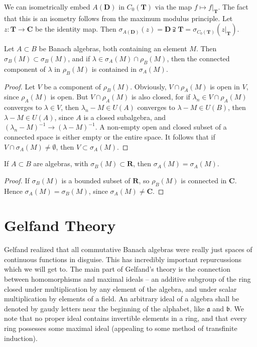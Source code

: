 \begin{example}
    We can isometrically embed $A(\mathbf{D})$ in $C_0(\mathbf{T})$ via the map $f \mapsto f|_\mathbf{T}$. The fact that this is an isometry follows from the maximum modulus principle. Let $z: \mathbf{T} \to \mathbf{C}$ be the identity map. Then $\sigma_{A(\mathbf{D})}(z) = \mathbf{D} \supsetneqq \mathbf{T} = \sigma_{C_0(\mathbf{T})}(z|_\mathbf{T})$.
\end{example}

\begin{theorem}
    Let $A \subset B$ be Banach algebras, both containing an element $M$. Then $\sigma_B(M) \subset \sigma_B(M)$, and if $\lambda \in \sigma_A(M) \cap \rho_B(M)$, then the connected component of $\lambda$ in $\rho_B(M)$ is contained in $\sigma_A(M)$.
\end{theorem}
\begin{proof}
    Let $V$ be a component of $\rho_B(M)$. Obviously, $V \cap \rho_A(M)$ is open in $V$, since $\rho_A(M)$ is open. But $V \cap \rho_A(M)$ is also closed, for if $\lambda_n \in V \cap \rho_A(M)$ converges to $\lambda \in V$, then $\lambda_n - M \in U(A)$ converges to $\lambda - M \in U(B)$, then $\lambda - M \in U(A)$, since $A$ is a closed subalgebra, and $(\lambda_n - M)^{-1} \to (\lambda - M)^{-1}$. A non-empty open and closed subset of a connected space is either empty or the entire space. It follows that if $V \cap \sigma_A(M) \neq \emptyset$, then $V \subset \sigma_A(M)$.
\end{proof}

\begin{corollary}
    If $A \subset B$ are algebras, with $\sigma_B(M) \subset \mathbf{R}$, then $\sigma_A(M) = \sigma_A(M)$.
\end{corollary}
\begin{proof}
    If $\sigma_B(M)$ is a bounded subset of $\mathbf{R}$, so $\rho_B(M)$ is connected in $\mathbf{C}$. Hence $\sigma_A(M) = \sigma_B(M)$, since $\sigma_A(M) \neq \mathbf{C}$.
\end{proof}

\section{Gelfand Theory}

Gelfand realized that all commutative Banach algebras were really just spaces of continuous functions in disguise. This has incredibly important repurcussions which we will get to. The main part of Gelfand's theory is the connection between homomorphisms and maximal ideals -- an additive subgroup of the ring closed under multiplication by any element of the algebra, and under scalar multiplication by elements of a field. An arbitrary ideal of a algebra shall be denoted by gaudy letters near the beginning of the alphabet, like $\mathfrak{a}$ and $\mathfrak{b}$. We note that no proper ideal contains invertible elements in a ring, and that every ring possesses some maximal ideal (appealing to some method of transfinite induction).

